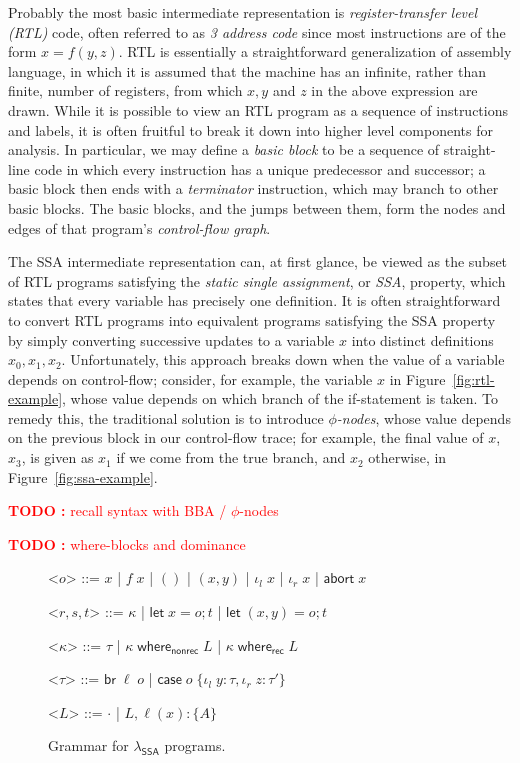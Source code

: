 \documentclass[acmsmall,screen,review]{acmart}
\newcounter{todos}
\newcommand{\TODO}[1]{{
  \stepcounter{todos}
  \begin{center}\large{\textcolor{red}{\textbf{TODO \arabic{todos}:} #1}}\end{center}
}}
\newcommand{\ms}[1]{\ensuremath{\mathsf{#1}}}
\newcommand{\lto}{:}
\newcommand{\linl}[1]{\iota_l\;{#1}}
\newcommand{\linr}[1]{\iota_r\;{#1}}
\newcommand{\labort}[1]{\ms{abort}\;{#1}}
\newcommand{\letstmt}[3]{\ensuremath{\ms{let}\;#1 = #2; #3}}
\newcommand{\brb}[2]{\ms{br}\;#1\;#2}
\newcommand{\casestmt}[5]{\ms{case}\;#1\;\{\linl{#2} \lto #3, \linr{#4} \lto #5\}}
\newcommand{\awhere}[2]{#1\;\ms{where}_{\ms{nonrec}}\;#2}
\newcommand{\cwhere}[2]{#1\;\ms{where}_{\ms{rec}}\;#2}
\newcommand{\wbranch}[3]{#1(#2) \lto \{#3\}}
\newcommand{\isotopessa}{\(\lambda_{\ms{SSA}}\)}
\begin{document}
Probably the most basic intermediate representation is \emph{register-transfer level (RTL)} code,
often referred to as \emph{3 address code} since most instructions are of the form $x = f(y, z)$.
RTL is essentially a straightforward generalization of assembly language, in which it is assumed
that the machine has an infinite, rather than finite, number of registers, from which $x, y$ and $z$
in the above expression are drawn.  While it is possible to view an RTL program as a sequence of
instructions and labels, it is often fruitful to break it down into higher level components for
analysis. In particular, we may define a \emph{basic block} to be a sequence of straight-line code
in which every instruction has a unique predecessor and successor; a basic block then ends with a
\emph{terminator} instruction, which may branch to other basic blocks. The basic blocks, and the
jumps between them, form the nodes and edges of that program's \emph{control-flow graph}.

The SSA intermediate representation can, at first glance, be viewed as the subset of RTL programs
satisfying the \emph{static single assignment}, or \emph{SSA}, property, which states that every
variable has precisely one definition. It is often straightforward to convert RTL programs into
equivalent programs satisfying the SSA property by simply converting successive updates to a
variable $x$ into distinct definitions $x_0, x_1, x_2$. Unfortunately, this approach breaks down
when the value of a variable depends on control-flow; consider, for example, the variable $x$ in
Figure~\ref{fig:rtl-example}, whose value depends on which branch of the if-statement is
taken. To remedy this, the traditional solution is to introduce \emph{$\phi$-nodes}, whose value
depends on the previous block in our control-flow trace; for example, the final value of $x$, $x_3$,
is given as $x_1$ if we come from the true branch, and $x_2$ otherwise, in
Figure~\ref{fig:ssa-example}.

\TODO{recall syntax with BBA / $\phi$-nodes}

\TODO{where-blocks and dominance}

\begin{figure}
  \begin{grammar}
    <\(o\)> ::= \(x\)
      \;|\; \(f\;x\)
      \;|\; \(()\)
      \;|\; \((x, y)\)
      \;|\;  \(\linl{x}\)
      \;|\; \(\linr{x}\)
      \;|\; \(\labort{x}\)

    <\(r, s, t\)> ::= \(\kappa\)
      \;|\; \(\letstmt{x}{o}{t}\)
      \;|\; \(\letstmt{(x, y)}{o}{t}\)

    <\(\kappa\)> ::= \(\tau\) \;|\; \(\awhere{\kappa}{L}\) \;|\; \(\cwhere{\kappa}{L}\)

    <\(\tau\)> ::= \(\brb{\ell}{o}\)
      \;|\; \(\casestmt{o}{y}{\tau}{z}{\tau'}\)

    <\(L\)> ::= \(\cdot\) \;|\; \(L, \wbranch{\ell}{x}{A}\)
  \end{grammar}
  \caption{Grammar for \isotopessa{} programs.}
  \Description{}
  \label{fig:ssa-syntax}
\end{figure}
\end{document}
